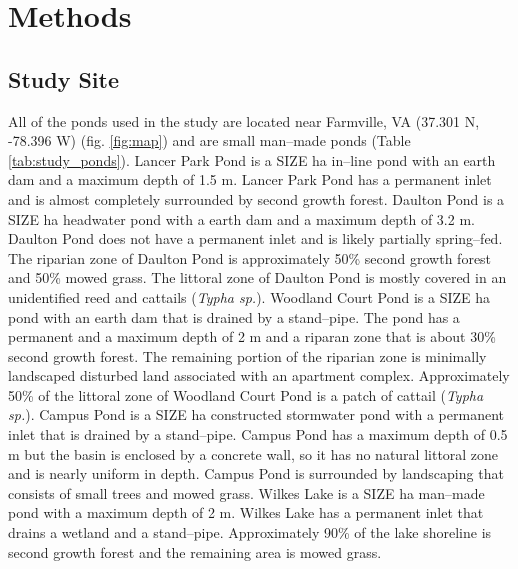 \section{Methods}
\subsection{Study Site}
All of the ponds used in the study are located near Farmville, VA (37.301 N, -78.396 W) (fig. \ref{fig:map}) and are small man--made ponds (Table \ref{tab:study_ponds}). Lancer Park Pond is a SIZE ha in--line pond with an earth dam and a maximum depth of 1.5 m. Lancer Park Pond has a permanent inlet and is almost completely surrounded by second growth forest. Daulton Pond is a SIZE ha headwater pond with a earth dam and a maximum depth of 3.2 m. Daulton Pond does not have a permanent inlet and is likely partially spring--fed. The riparian zone of Daulton Pond is approximately 50\% second growth forest and 50\% mowed grass. The littoral zone of Daulton Pond is mostly covered in an unidentified reed and cattails (\emph{Typha sp.}). Woodland Court Pond is a SIZE ha pond with an earth dam that is drained by a stand--pipe. The pond has a permanent and a maximum depth of 2 m and a riparan zone that is about 30\% second growth forest. The remaining portion of the riparian zone is minimally landscaped disturbed land associated with an apartment complex. Approximately 50\% of the littoral zone of Woodland Court Pond is a patch of cattail (\emph{Typha sp.}). Campus Pond is a SIZE ha constructed stormwater pond with a permanent inlet that is drained by a stand--pipe. Campus Pond has a maximum depth of 0.5 m but the basin is enclosed by a concrete wall, so it has no natural littoral zone and is nearly uniform in depth. Campus Pond is surrounded by landscaping that consists of small trees and mowed grass. Wilkes Lake is a SIZE ha man--made pond with a maximum depth of 2 m. Wilkes Lake has a permanent inlet that drains a wetland and a stand--pipe. Approximately 90\% of the lake shoreline is second growth forest and the remaining area is mowed grass.


    
